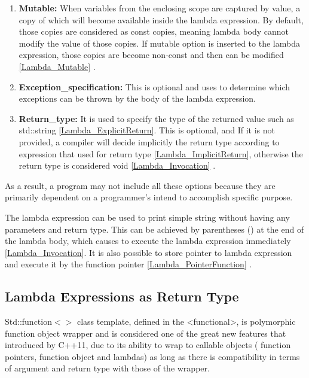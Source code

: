 \documentclass[11pt]{report}
\begin{document}
\begin{enumerate}
\item \textbf{Mutable:} When variables from the enclosing scope are captured by value, a copy of which will become available inside the lambda expression. By default, those copies are considered as const copies, meaning lambda body cannot modify the value of those copies. If mutable option is inserted to the lambda expression, those copies are become non-const and then can be modified \ref{Lambda_Mutable} \cite{Cppreference:2012:Cpp11}.

\item \textbf{Exception\_specification:} This is optional and uses to determine which exceptions can be thrown by the body of the lambda expression.

\item \textbf{Return\_type:} It is used to specify the type of the returned value such as std::string \ref{Lambda_ExplicitReturn}. This is optional, and If it is not provided, a compiler will decide implicitly the return type according to expression that used for return type \ref{Lambda_ImplicitReturn}, otherwise the return type is considered void \ref{Lambda_Invocation} \cite{Cppreference:2012:Cpp11}.
\end{enumerate}

As a result, a program may not include all these options because they are primarily dependent on a programmer's intend to accomplish specific purpose.


The lambda expression can be used to print simple string without having any parameters and return type. This can be achieved by parentheses () at the end of the lambda body, which causes to execute the lambda expression immediately \ref{Lambda_Invocation}. It is also possible to store pointer to lambda expression and execute it by the function pointer \ref{Lambda_PointerFunction} \cite{Gregorie:professionalcpp}.


\subsection{Lambda Expressions as Return Type}
\label{subsection: Lambda Expressions as Return Type}
Std::function$<>$ class template, defined in the <functional>, is polymorphic function object wrapper and is considered one of the great new features that introduced by C++11, due to its ability to wrap to callable objects ( function pointers, function object and lambdas) as long as there is compatibility in terms of argument  and return type with those of the wrapper.
\end{document}
